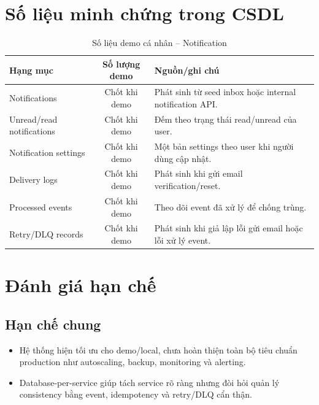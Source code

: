 \documentclass[14pt,a4paper,oneside]{extreport}
\begin{document}
\section{Số liệu minh chứng trong CSDL}
\label{sec:so-lieu-minh-chung}

\begin{table}[H]
\centering
\caption{Số liệu demo cá nhân -- Notification}
\label{tab:so-lieu-demo}
\renewcommand{\arraystretch}{1.3}
\small
\begin{tabularx}{\textwidth}{|l|c|X|}
\hline
\textbf{Hạng mục} & \textbf{Số lượng demo} & \textbf{Nguồn/ghi chú} \\
\hline
Notifications & Chốt khi demo & Phát sinh từ seed inbox hoặc internal notification API. \\
\hline
Unread/read notifications & Chốt khi demo & Đếm theo trạng thái read/unread của user. \\
\hline
Notification settings & Chốt khi demo & Một bản settings theo user khi người dùng cập nhật. \\
\hline
Delivery logs & Chốt khi demo & Phát sinh khi gửi email verification/reset. \\
\hline
Processed events & Chốt khi demo & Theo dõi event đã xử lý để chống trùng. \\
\hline
Retry/DLQ records & Chốt khi demo & Phát sinh khi giả lập lỗi gửi email hoặc lỗi xử lý event. \\
\hline
\end{tabularx}
\end{table}

\section{Đánh giá hạn chế}
\label{sec:han-che}

\subsection{Hạn chế chung}

\begin{itemize}[leftmargin=2cm]
  \item Hệ thống hiện tối ưu cho demo/local, chưa hoàn thiện toàn bộ tiêu chuẩn production như autoscaling, backup, monitoring và alerting.
  \item Database-per-service giúp tách service rõ ràng nhưng đòi hỏi quản lý consistency bằng event, idempotency và retry/DLQ cẩn thận.
\end{itemize}
\end{document}
